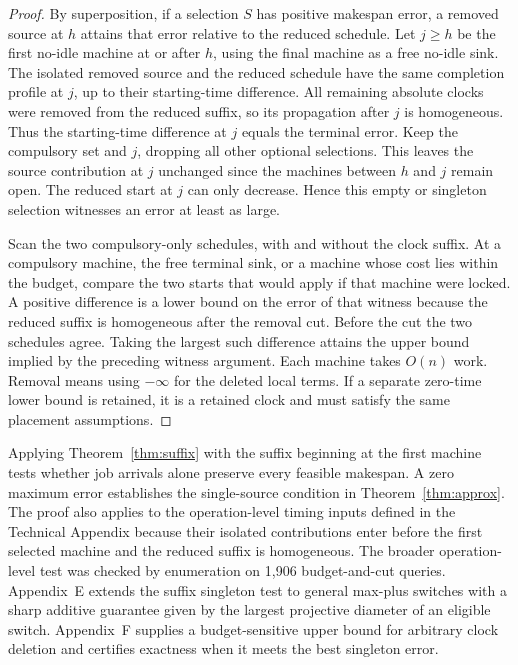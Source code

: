 \documentclass[11pt,letterpaper]{article}
\begin{document}
\begin{proof}
By superposition, if a selection $S$ has positive makespan error, a removed source at $h$ attains that error relative to the reduced schedule. Let $j\ge h$ be the first no-idle machine at or after $h$, using the final machine as a free no-idle sink. The isolated removed source and the reduced schedule have the same completion profile at $j$, up to their starting-time difference. All remaining absolute clocks were removed from the reduced suffix, so its propagation after $j$ is homogeneous. Thus the starting-time difference at $j$ equals the terminal error. Keep the compulsory set and $j$, dropping all other optional selections. This leaves the source contribution at $j$ unchanged since the machines between $h$ and $j$ remain open. The reduced start at $j$ can only decrease. Hence this empty or singleton selection witnesses an error at least as large.

Scan the two compulsory-only schedules, with and without the clock suffix. At a compulsory machine, the free terminal sink, or a machine whose cost lies within the budget, compare the two starts that would apply if that machine were locked. A positive difference is a lower bound on the error of that witness because the reduced suffix is homogeneous after the removal cut. Before the cut the two schedules agree. Taking the largest such difference attains the upper bound implied by the preceding witness argument. Each machine takes $O(n)$ work. Removal means using $-\infty$ for the deleted local terms. If a separate zero-time lower bound is retained, it is a retained clock and must satisfy the same placement assumptions.
\end{proof}

Applying Theorem~\ref{thm:suffix} with the suffix beginning at the first machine tests whether job arrivals alone preserve every feasible makespan. A zero maximum error establishes the single-source condition in Theorem~\ref{thm:approx}. The proof also applies to the operation-level timing inputs defined in the Technical Appendix because their isolated contributions enter before the first selected machine and the reduced suffix is homogeneous. The broader operation-level test was checked by enumeration on 1,906 budget-and-cut queries. Appendix~E extends the suffix singleton test to general max-plus switches with a sharp additive guarantee given by the largest projective diameter of an eligible switch. Appendix~F supplies a budget-sensitive upper bound for arbitrary clock deletion and certifies exactness when it meets the best singleton error.
\end{document}
